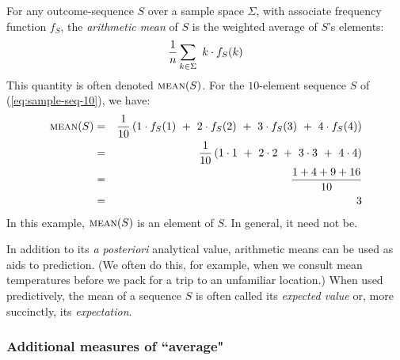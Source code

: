    
For any outcome-sequence $S$ over a sample space $\Sigma$, with associate frequency function $f_S$, the {\it arithmetic mean} of $S$ is the weighted average of $S$'s elements:
\[ {1 \over n} \sum_{k \in \Sigma} \ k \cdot f_S(k) \]
This quantity is often denoted $\mbox{\sc mean}(S)$.  For the $10$-element sequence $S$ of (\ref{eq:sample-seq-10}), we have:
\begin{eqnarray*}
\mbox{\sc mean}(S) & = &
{1 \over 10} \left(1 \cdot f_S(1) \ + \ 2 \cdot f_S(2) \ + \ 3 \cdot f_S(3) \ + \ 4 \cdot f_S(4) \right) \\
 & = &
{1 \over 10} \left(1 \cdot 1 \ + \ 2 \cdot 2 \ + \ 3 \cdot 3 \ + \ 4 \cdot 4 \right) \\
 & = &
\frac{1 + 4 + 9 + 16}{10} \\
 & = & 3
\end{eqnarray*}
In this example, $\mbox{\sc mean}(S)$ is an element of $S$.  In general, it need not be.

In addition to its {\em a posteriori} analytical value, arithmetic means can be used as aids to prediction.  (We often do this, for example, when we consult mean temperatures before we pack for a trip to an unfamiliar location.)  When used predictively, the mean of a sequence $S$ is often called its {\it expected value} or, more succinctly, its {\it expectation}.
 

\subsubsection{Additional measures of ``average"}
\label{sec:median-mode}

